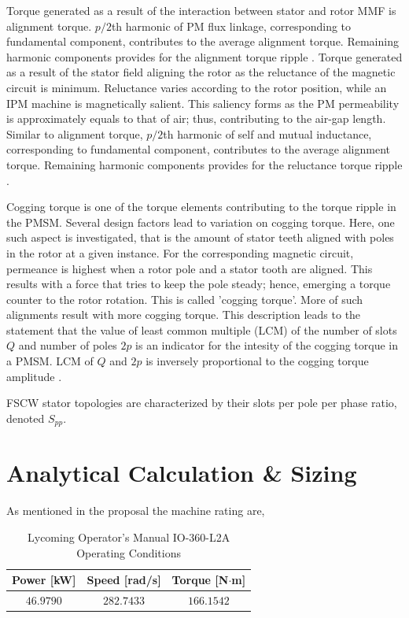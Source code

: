 \documentclass [a4 paper, 11pt, titlepage] {article}
\begin{document}
	Torque generated as a result of the interaction between stator and rotor MMF is alignment torque. $p/2$th harmonic of PM flux linkage, corresponding to fundamental component, contributes to the average alignment torque. Remaining harmonic components provides for the alignment torque ripple \cite{farshadnia_advanced_2018}.
	Torque generated as a result of the stator field aligning the rotor as the reluctance of the magnetic circuit is minimum. Reluctance varies according to the rotor position, while an IPM machine is magnetically salient. This saliency forms as the PM permeability is approximately equals to that of air; thus, contributing to the air-gap length. Similar to alignment torque, $p/2$th harmonic of self and mutual inductance, corresponding to fundamental component, contributes to the average alignment torque. Remaining harmonic components provides for the reluctance torque ripple \cite{farshadnia_advanced_2018}.
	
		
	Cogging torque is one of the torque elements contributing to the torque ripple in the PMSM. Several design factors lead to variation on cogging torque. Here, one such aspect is investigated, that is the amount of stator teeth aligned with poles in the rotor at a given instance. For the corresponding magnetic circuit, permeance is highest when a rotor pole and a stator tooth are aligned. This results with a force that tries to keep the pole steady; hence, emerging a torque counter to the rotor rotation. This is called 'cogging torque'. More of such alignments result with more cogging torque. This description leads to the statement that the value of least common multiple (LCM) of the number of slots $Q$ and number of poles $2p$ is an indicator for the intesity of the cogging torque in a PMSM. LCM of $Q$ and $2p$ is inversely proportional to the cogging torque amplitude \cite{farshadnia_advanced_2018} \cite{zhu_influence_2000}.
	
	
	
	
	
	
	
	
	
	
	FSCW stator topologies are characterized by their slots per pole per phase ratio, denoted $S_{pp}$\cite{farshadnia_advanced_2018}. 
	
	
	
	
	
	
	\section{Analytical Calculation \& Sizing}
	As mentioned in the proposal the machine rating are,
	\begin{table}[h]
		\begin{center}
			\begin{tabular}{c|c|c}
				Power [kW] &  Speed [rad/s] &  Torque [N$\cdot$m]\\
				\hline
				$46.9790$ & $282.7433$ & $166.1542$
			\end{tabular}
		\end{center}
		\caption{Lycoming Operator's Manual IO-360-L2A Operating Conditions}
		\label{fig:EMoperations}
	\end{table}
	
\end{document}

